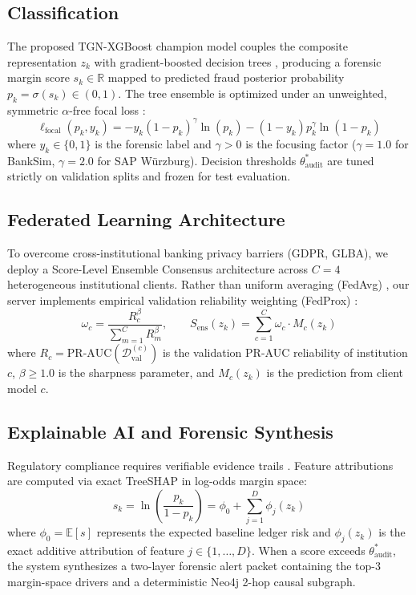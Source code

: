 \subsection{Classification}\label{sec:model_class}
The proposed TGN-XGBoost champion model couples the composite representation $z_k$ with gradient-boosted decision trees \cite{chen2016xgboost}, producing a forensic margin score $s_k \in \mathbb{R}$ mapped to predicted fraud posterior probability $p_k = \sigma(s_k) \in (0, 1)$. The tree ensemble is optimized under an unweighted, symmetric $\alpha$-free focal loss \cite{lin2017focal}:
\begin{equation}
\ell_{\text{focal}}(p_k, y_k) = - y_k \left(1 - p_k\right)^\gamma \ln\left(p_k\right) - (1 - y_k) p_k^\gamma \ln\left(1 - p_k\right)
\label{eq:focal_objective}
\end{equation}
where $y_k \in \{0, 1\}$ is the forensic label and $\gamma > 0$ is the focusing factor ($\gamma = 1.0$ for BankSim, $\gamma = 2.0$ for SAP W{\"u}rzburg). Decision thresholds $\theta_{\text{audit}}^*$ are tuned strictly on validation splits and frozen for test evaluation.

\subsection{Federated Learning Architecture}\label{sec:model_federated}
To overcome cross-institutional banking privacy barriers (GDPR, GLBA), we deploy a Score-Level Ensemble Consensus architecture across $C=4$ heterogeneous institutional clients. Rather than uniform averaging (FedAvg) \cite{mcmahan2017communication}, our server implements empirical validation reliability weighting (FedProx) \cite{li2020federated}:
\begin{equation}
\omega_c = \frac{R_c^\beta}{\sum_{m=1}^C R_m^\beta}, \qquad S_{\text{ens}}(z_k) = \sum_{c=1}^C \omega_c \cdot M_c\left(z_k\right)
\label{eq:fed_consensus}
\end{equation}
where $R_c = \text{PR-AUC}(\mathcal{D}_{\text{val}}^{(c)})$ is the validation PR-AUC reliability of institution $c$, $\beta \ge 1.0$ is the sharpness parameter, and $M_c(z_k)$ is the prediction from client model $c$.

\subsection{Explainable AI and Forensic Synthesis}\label{sec:model_xai}
Regulatory compliance requires verifiable evidence trails \cite{faccia2026xaiauditing,uddin2026shapley}. Feature attributions are computed via exact TreeSHAP \cite{lundberg2020treeshap} in log-odds margin space:
\begin{equation}
s_k = \ln\left(\frac{p_k}{1 - p_k}\right) = \phi_0 + \sum_{j=1}^D \phi_j\left(z_k\right)
\label{eq:treeshap_additivity}
\end{equation}
where $\phi_0 = \mathbb{E}[s]$ represents the expected baseline ledger risk and $\phi_j(z_k)$ is the exact additive attribution of feature $j \in \{1, \dots, D\}$. When a score exceeds $\theta_{\text{audit}}^*$, the system synthesizes a two-layer forensic alert packet containing the top-3 margin-space drivers and a deterministic Neo4j 2-hop causal subgraph.
